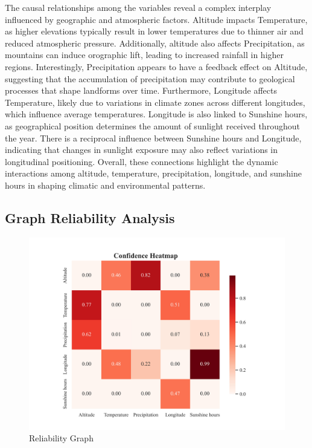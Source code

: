 \documentclass{article}
\begin{document}
The causal relationships among the variables reveal a complex interplay influenced by geographic and atmospheric factors. Altitude impacts Temperature, as higher elevations typically result in lower temperatures due to thinner air and reduced atmospheric pressure. Additionally, altitude also affects Precipitation, as mountains can induce orographic lift, leading to increased rainfall in higher regions. Interestingly, Precipitation appears to have a feedback effect on Altitude, suggesting that the accumulation of precipitation may contribute to geological processes that shape landforms over time. Furthermore, Longitude affects Temperature, likely due to variations in climate zones across different longitudes, which influence average temperatures. Longitude is also linked to Sunshine hours, as geographical position determines the amount of sunlight received throughout the year. There is a reciprocal influence between Sunshine hours and Longitude, indicating that changes in sunlight exposure may also reflect variations in longitudinal positioning. Overall, these connections highlight the dynamic interactions among altitude, temperature, precipitation, longitude, and sunshine hours in shaping climatic and environmental patterns.

\subsection{Graph Reliability Analysis}
\begin{figure}[H]
        \centering
        \vspace{-0.5cm}
        \includegraphics[width=0.8\linewidth]{data/dataset/DWD/output_graph/confidence_heatmap.jpg}
        \caption{Reliability Graph}
        \label{fig:sub3}
\end{figure}
\end{document}
